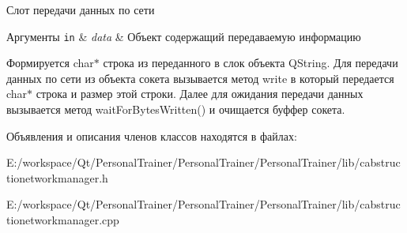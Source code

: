 Слот передачи данных по сети 


\begin{DoxyParams}[1]{Аргументы}
\mbox{\tt in}  & {\em data} & Объект содержащий передаваемую информацию\\
\hline
\end{DoxyParams}
Формируется char$\ast$ строка из переданного в слок объекта Q\+String. Для передачи данных по сети из объекта сокета вызывается метод write в который передается char$\ast$ строка и размер этой строки. Далее для ожидания передачи данных вызывается метод wait\+For\+Bytes\+Written() и очищается буффер сокета. 

Объявления и описания членов классов находятся в файлах\+:\begin{DoxyCompactItemize}
\item 
E\+:/workspace/\+Qt/\+Personal\+Trainer/\+Personal\+Trainer/\+Personal\+Trainer/lib/cabstructionetworkmanager.\+h\item 
E\+:/workspace/\+Qt/\+Personal\+Trainer/\+Personal\+Trainer/\+Personal\+Trainer/lib/cabstructionetworkmanager.\+cpp\end{DoxyCompactItemize}

